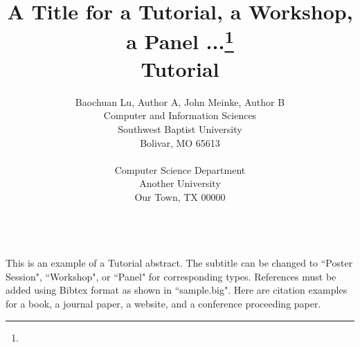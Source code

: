 \documentclass{article}
\title{A Title for a Tutorial, a Workshop, a Panel ...\footnote{\protect}
\\
\vspace{0.2in}
\large{
Tutorial
}}
\author{
Baochuan Lu\affmark[1], Author A\affmark[1], John Meinke\affmark[2], Author B\affmark[2]\\
\affmark[1]Computer and Information Sciences\\
Southwest Baptist University\\
Bolivar, MO 65613\\
\email{\{blu,author\}@sbuniv.edu}\\
\affmark[2]Computer Science Department\\
Another University\\
Our Town, TX 00000\\
\email{\{jmeinke,author\}@univ.edu}\\
}
\begin{document}
\maketitle

This is an example of a Tutorial abstract. The subtitle can be changed to ``Poster Session", ``Workshop", or ``Panel" for corresponding types. References must be added using Bibtex format as shown in ``sample.big". Here are citation examples for a book\cite{latexcompanion}, a journal paper\cite{einstein}, a website\cite{knuthwebsite}, and a conference proceeding paper\cite{maurer}.

\lipsum[1-2]



\end{document}
